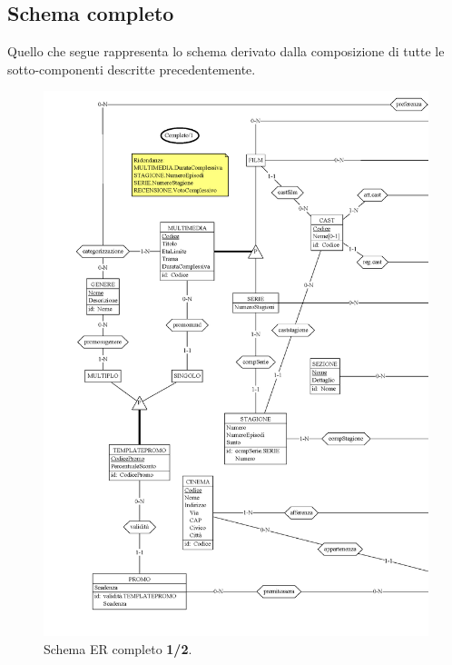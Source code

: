 \documentclass[a4paper,12pt]{report}
\begin{document}
\subsection{Schema completo}
Quello che segue rappresenta lo schema derivato dalla composizione di tutte le sotto-componenti descritte precedentemente.
\begin{figure}[H]
	\centering
	\includegraphics[width=450pt]{ER/ercompletosx.png}
	\caption{Schema ER completo \textbf{1/2}.}
\end{figure}
\end{document}
